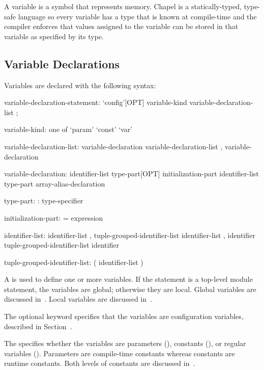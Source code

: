 \label{Variables}

A variable is a symbol that represents memory.  Chapel is a
statically-typed, type-safe language so every variable has a type that
is known at compile-time and the compiler enforces that values
assigned to the variable can be stored in that variable as specified
by its type.

\subsection{Variable Declarations}
\label{Variable_Declarations}

Variables are declared with the following syntax:
\begin{syntax}
variable-declaration-statement:
  `config'[OPT] variable-kind variable-declaration-list ;

variable-kind: one of
  `param' `const' `var'

variable-declaration-list:
  variable-declaration
  variable-declaration-list , variable-declaration

variable-declaration:
  identifier-list type-part[OPT] initialization-part
  identifier-list type-part
  array-alias-declaration

type-part:
  : type-specifier

initialization-part:
  = expression

identifier-list:
  identifier-list , tuple-grouped-identifier-list
  identifier-list , identifier
  tuple-grouped-identifier-list
  identifier

tuple-grouped-identifier-list:
  ( identifier-list )
\end{syntax}
A  is used to define one or more
variables.  If the statement is a top-level module statement, the
variables are global; otherwise they are local.  Global variables are
discussed in~.  Local variables are discussed
in~.

The optional keyword  specifies that the variables are
configuration variables, described in
Section~.

The  specifies whether the variables are
parameters (), constants (), or regular
variables ().  Parameters are compile-time constants whereas
constants are runtime constants.  Both levels of constants are
discussed in~.

